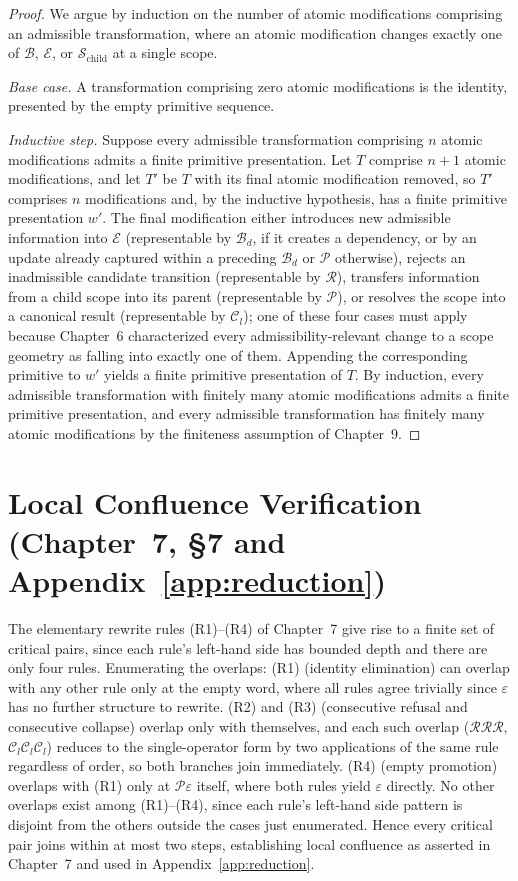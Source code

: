 \documentclass[11pt,twoside,openright]{book}
\numberwithin{equation}{chapter}
\theoremstyle{definition}
\theoremstyle{plain}
\theoremstyle{remark}
\theoremstyle{definition}
\newcommand{\Pop}{\mathcal{P}}
\newcommand{\Refuse}{\mathcal{R}}
\newcommand{\Bind}{\mathcal{B}_d}
\newcommand{\Collapse}{\mathcal{C}_l}
\newcommand{\Boundary}{\mathcal{B}}
\newcommand{\Interior}{\mathcal{E}}
\newcommand{\Children}{\mathcal{S}_{\mathrm{child}}}
\begin{document}
\begin{proof}
We argue by induction on the number of atomic modifications comprising an
admissible transformation, where an atomic modification changes exactly
one of $\Boundary$, $\Interior$, or $\Children$ at a single scope.

\emph{Base case.} A transformation comprising zero atomic modifications is
the identity, presented by the empty primitive sequence.

\emph{Inductive step.} Suppose every admissible transformation comprising
$n$ atomic modifications admits a finite primitive presentation. Let $T$
comprise $n+1$ atomic modifications, and let $T'$ be $T$ with its final
atomic modification removed, so $T'$ comprises $n$ modifications and, by
the inductive hypothesis, has a finite primitive presentation $w'$. The
final modification either introduces new admissible information into
$\Interior$ (representable by $\Bind$, if it creates a dependency, or by
an update already captured within a preceding $\Bind$ or $\Pop$
otherwise), rejects an inadmissible candidate transition (representable
by $\Refuse$), transfers information from a child scope into its parent
(representable by $\Pop$), or resolves the scope into a canonical result
(representable by $\Collapse$); one of these four cases must apply
because Chapter~6 characterized every admissibility-relevant change to a
scope geometry as falling into exactly one of them. Appending the
corresponding primitive to $w'$ yields a finite primitive presentation of
$T$. By induction, every admissible transformation with finitely many
atomic modifications admits a finite primitive presentation, and every
admissible transformation has finitely many atomic modifications by the
finiteness assumption of Chapter~9.
\end{proof}

\section{Local Confluence Verification (Chapter~7, \S7 and Appendix~\ref{app:reduction})}

The elementary rewrite rules (R1)--(R4) of Chapter~7 give rise to a finite
set of critical pairs, since each rule's left-hand side has bounded depth
and there are only four rules. Enumerating the overlaps: (R1) (identity
elimination) can overlap with any other rule only at the empty word,
where all rules agree trivially since $\varepsilon$ has no further
structure to rewrite. (R2) and (R3) (consecutive refusal and consecutive
collapse) overlap only with themselves, and each such overlap
($\Refuse\Refuse\Refuse$, $\Collapse\Collapse\Collapse$) reduces to the
single-operator form by two applications of the same rule regardless of
order, so both branches join immediately. (R4) (empty promotion) overlaps
with (R1) only at $\Pop\varepsilon$ itself, where both rules yield
$\varepsilon$ directly. No other overlaps exist among (R1)--(R4), since
each rule's left-hand side pattern is disjoint from the others outside
the cases just enumerated. Hence every critical pair joins within at most
two steps, establishing local confluence as asserted in Chapter~7 and
used in Appendix~\ref{app:reduction}.
\end{document}
